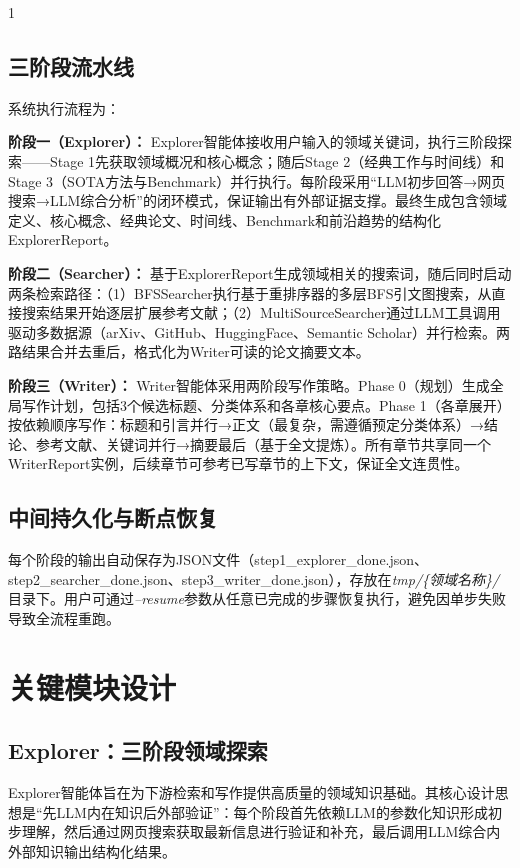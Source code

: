 \documentclass[10.5pt,compsoc,UTF8]{CjC}
\theoremstyle{mystyle}
\begin{document}
\begin{multicols}{1}

\subsection{三阶段流水线}

系统执行流程为：

\textbf{阶段一（Explorer）：} Explorer智能体接收用户输入的领域关键词，执行三阶段探索——Stage 1先获取领域概况和核心概念；随后Stage 2（经典工作与时间线）和Stage 3（SOTA方法与Benchmark）并行执行。每阶段采用``LLM初步回答→网页搜索→LLM综合分析''的闭环模式，保证输出有外部证据支撑。最终生成包含领域定义、核心概念、经典论文、时间线、Benchmark和前沿趋势的结构化ExplorerReport。

\textbf{阶段二（Searcher）：} 基于ExplorerReport生成领域相关的搜索词，随后同时启动两条检索路径：（1）BFSSearcher执行基于重排序器的多层BFS引文图搜索，从直接搜索结果开始逐层扩展参考文献；（2）MultiSourceSearcher通过LLM工具调用驱动多数据源（arXiv、GitHub、HuggingFace、Semantic Scholar）并行检索。两路结果合并去重后，格式化为Writer可读的论文摘要文本。

\textbf{阶段三（Writer）：} Writer智能体采用两阶段写作策略。Phase 0（规划）生成全局写作计划，包括3个候选标题、分类体系和各章核心要点。Phase 1（各章展开）按依赖顺序写作：标题和引言并行→正文（最复杂，需遵循预定分类体系）→结论、参考文献、关键词并行→摘要最后（基于全文提炼）。所有章节共享同一个WriterReport实例，后续章节可参考已写章节的上下文，保证全文连贯性。

\subsection{中间持久化与断点恢复}

每个阶段的输出自动保存为JSON文件（step1\_explorer\_done.json、step2\_searcher\_done.json、step3\_writer\_done.json），存放在\emph{tmp/\{领域名称\}/}目录下。用户可通过\emph{--resume}参数从任意已完成的步骤恢复执行，避免因单步失败导致全流程重跑。

\section{\heiti 关键模块设计}

\subsection{Explorer：三阶段领域探索}

Explorer智能体旨在为下游检索和写作提供高质量的领域知识基础。其核心设计思想是``先LLM内在知识后外部验证''：每个阶段首先依赖LLM的参数化知识形成初步理解，然后通过网页搜索获取最新信息进行验证和补充，最后调用LLM综合内外部知识输出结构化结果。


\end{multicols}
\end{document}
